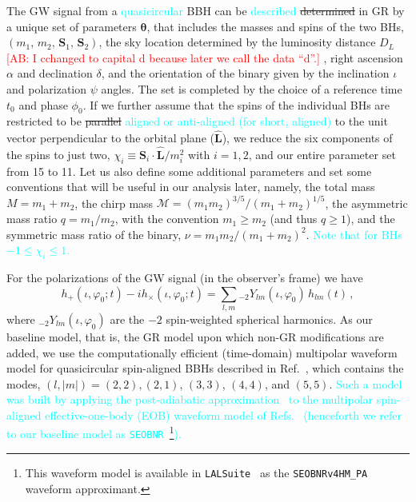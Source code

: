 \documentclass[twocolumn,
               prd,
               aps,
               superscriptaddress,
               tightenlines,
               nofootinbib,
               eqsecnum,
               amsfonts,
               amsmath,
               longbibliography]{revtex4-1}
\newcommand{\SEOB}{\texttt{SEOBNR}}
\newcommand{\ab}[1]{{\textcolor{cyan}{{#1}} }}
\newcommand{\abcomm}[1]{{\textcolor{red}{{[AB: #1]}} }}
\begin{document}
The GW signal from a \ab{quasicircular} BBH can be \ab{described} \sout{determined} in GR by a unique set of
parameters $\bm{\theta}$, that includes the masses and spins of the two BHs,
$(m_1,\, m_2,\, \mathbf{S}_1,\, \mathbf{S}_2)$, the sky location determined by the
luminosity distance $D_L$\abcomm{I cchanged to capital d because later we call the 
data ``d''.}, right ascension $\alpha$ and declination $\delta$,
and the orientation of the binary given by the inclination $\iota$ and polarization $\psi$
angles.
%
The set is completed by the choice of a reference time $t_0$ and phase
$\phi_0$. If we further assume that the spins of the individual BHs are
restricted to be \sout{parallel} \ab{aligned or anti-aligned (for short, aligned)} to the unit vector 
perpendicular to the orbital plane ($\mathbf{\hat{L}}$), we reduce the six
components of the spins to just two, $\chi_i \equiv \mathbf{S}_i\cdot \mathbf{\hat{L}} /m_i^2$ with $i = 1,2$, 
and our entire parameter set from 15 to 11.
%
Let us also define some additional parameters and set some conventions that
will be useful in our analysis later, namely, the total mass
%
$M=m_1+m_2$,
%
the chirp mass
%
$\mathcal {M}=(m_{1}m_{2})^{3/5}/(m_{1}+m_{2})^{1/5}$,
%
the asymmetric mass ratio $q=m_1/m_2$, with the convention $m_1 \geqslant m_2$ (and thus $q \geqslant 1$),
and the symmetric mass ratio of the binary, $\nu = m_1m_2/(m_1+m_2)^2$. \ab{Note that for BHs $-1 \leq \chi_i \leq 1$.}

For the polarizations of the GW signal (in the observer's frame) we have
%
\begin{equation}
h_+(\iota,\varphi_0;t ) - i h_\times(\iota,\varphi_0;t) = \sum_{l, m} {}_{-\!2}Y_{l m}(\iota,\varphi_0)\, h_{l m}(t)\,,
\end{equation}
%
where ${}_{-\!2}Y_{l m}(\iota,\varphi_0)$ are the $-2$ spin-weighted spherical
harmonics.
%
%
As our baseline model, that is, the GR model upon which non-GR modifications
are added, we use the computationally efficient (time-domain) multipolar
waveform model for quasicircular spin-aligned BBHs described in
Ref.~\cite{Mihaylov:2021bpf}, which contains the modes, $(l, |m|)=(2,2),(2,1)$, $(3,3)$, $(4,4)$,
and $(5,5)$. \ab{Such a model was built by applying the post-adiabatic approximation~\cite{Nagar:2018gnk} 
to the multipolar spin-aligned effective-one-body (EOB) waveform model of Refs.~\cite{Bohe:2016gbl,Cotesta:2018fcv} 
(henceforth we refer to our baseline model as \SEOB{}~\footnote{This waveform
model is available in \texttt{LALSuite}~\cite{lalsuite} as the \texttt{SEOBNRv4HM\_PA}
waveform approximant.}).}
\end{document}
